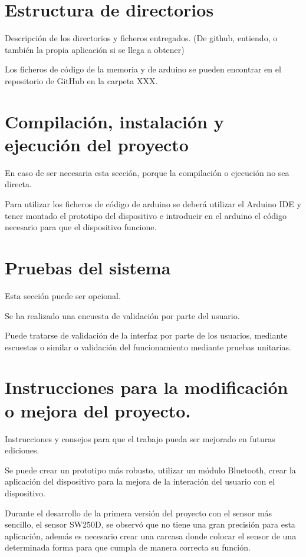 
\section{Estructura de directorios}

Descripción de los directorios y ficheros entregados. (De github, entiendo, o también la propia aplicación si se llega a obtener)

Los ficheros de código de la memoria y de arduino se pueden encontrar en el repositorio de GitHub en la carpeta XXX.

\section{Compilación, instalación y ejecución del proyecto}

En caso de ser necesaria esta sección, porque la compilación o ejecución no sea directa.

Para utilizar los ficheros de código de arduino se deberá utilizar el Arduino IDE y tener montado el prototipo del dispositivo e introducir en el arduino el código necesario para que el dispositivo funcione.

\section{Pruebas del sistema}
Esta sección puede ser opcional.

Se ha realizado una encuesta de validación por parte del usuario.

Puede tratarse de validación de la interfaz por parte de los usuarios, mediante escuestas o similar o validación del funcionamiento mediante pruebas unitarias.



\section{Instrucciones para la modificación o mejora del proyecto.}

Instrucciones y consejos para que el trabajo pueda ser mejorado en futuras ediciones.

Se puede crear un prototipo más robusto, utilizar un módulo Bluetooth, crear la aplicación del dispositivo para la mejora de la interación del usuario con el dispositivo.

Durante el desarrollo de la primera versión del proyecto con el sensor más sencillo, el sensor SW250D, se observó que no tiene una gran precisión para esta aplicación, además es necesario crear una carcasa donde colocar el sensor de una determinada forma para que cumpla de manera correcta su función.